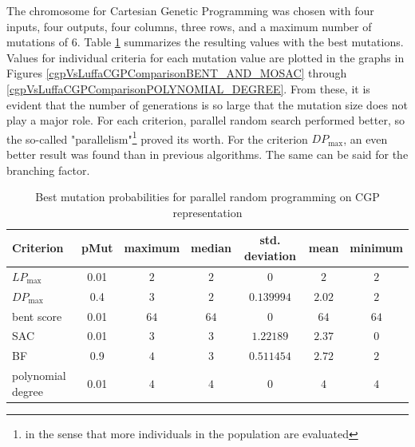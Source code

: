The chromosome for Cartesian Genetic Programming was chosen with four inputs, four outputs, four columns,
three rows, and a maximum number of mutations of 6. Table \ref{tabCGPParallelRadnomParameters} summarizes the resulting
values with the best mutations. Values for individual criteria for each mutation value
are plotted in the graphs in Figures \ref{cgpVsLuffaCGPComparisonBENT_AND_MOSAC} through \ref{cgpVsLuffaCGPComparisonPOLYNOMIAL_DEGREE}.
From these, it is evident that the number of generations is so large that the mutation size does not play a major role.
For each criterion, parallel random search performed better,
so the so-called "parallelism"\footnote{in the sense that more individuals in the population are evaluated}
proved its worth.
For the criterion $DP_{\max}$, an even better result was found than in previous algorithms.
The same can be said for the branching factor.
\begin{table}[bt]
\begin{center}
\begin{tabular}{| l | c | c | c | c | c | c |}
\hline
Criterion & pMut & maximum & median & std. deviation & mean & minimum \\ \hline
$LP_{\max}$ & 0.01 & $2$ & $2$ & $0$ & $2$ & $2$ \\ \hline
$DP_{\max}$ & 0.4 & $3$ & $2$ & $0.139994$ & $2.02$ & $2$ \\ \hline
bent score & 0.01 & $64$ & $64$ & $0$ & $64$ & $64$ \\ \hline
SAC & 0.01 & $3$ & $3$ & $1.22189$ & $2.37$ & $0$ \\ \hline
BF & 0.9 & $4$ & $3$ & $0.511454$ & $2.72$ & $2$ \\ \hline
polynomial degree & 0.01 & $4$ & $4$ & $0$ & $4$ & $4$ \\ \hline
\end{tabular}
\caption{Best mutation probabilities for parallel random programming on CGP representation} %
\label{tabCGPParallelRadnomParameters}
\end{center}
\end{table}
